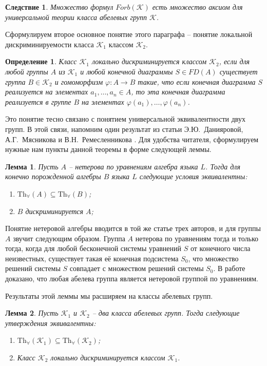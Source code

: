 \documentclass[a4paper,11pt,twoside]{article}
\newtheorem{lemma}{Лемма}[section]
\newtheorem{corollary}{Следствие}[section]
\newtheorem{definition}{Определение}[section]
\def\K{{\mathcal{K}}}
\def\Tha{{\mathrm{Th}_\forall}}
\begin{document}
\begin{corollary}\label{cor:ForbIsAxioms}
Множество формул $Forb(\K)$ есть множество аксиом для универсальной теории класса абелевых групп $\K$.
\end{corollary}


Сформулируем второе основное понятие этого параграфа -- понятие локальной дискриминируемости класса $\K_1$ классом $\K_2$.
\begin{definition}
Класс $\K_1$ локально дискриминируется классом $\K_2$, если для любой группы $A$ из $\K_1$ и любой конечной диаграммы $S \in FD(A)$ существует группа $B \in \K_2$ и гомоморфизм $\varphi: A \rightarrow B$ такие, что если конечная диаграмма $S$ реализуется на элементах $a_1, \ldots, a_n \in A$, то эта конечная диаграмма реализуется в группе $B$ на элементах $\varphi(a_1), \ldots, \varphi(a_n)$.
\end{definition}

Это понятие тесно связано с понятием универсальной эквивалентности двух групп. В этой связи, напомним один результат из статьи Э.Ю.~Данияровой, А.Г.~Мясникова и В.Н.~Ремесленникова \cite{DMR1}. Для удобства читателя, сформулируем нужные нам пункты данной теоремы в форме следующей леммы.

\begin{lemma}\label{lemma:UnivEquiv}
Пусть $A$ -- нетерова по уравнениям алгебра языка $L$. Тогда для конечно порожденной алгебры $B$ языка $L$ следующие условия эквивалентны:
\begin{enumerate}
\item $\mathrm{Th}_{\forall}(A) \subseteq \mathrm{Th}_{\forall}(B)$;
\item $B$ дискриминируется $A$;
\end{enumerate}
\end{lemma}

Понятие нетеровой алгебры вводится в той же статье трех авторов, и для группы $A$ звучит следующим образом. Группа $A$ нетерова по уравнениям тогда и только тогда, когда для любой бесконечной системы уравнений $S$ от конечного числа неизвестных, существует такая её конечная подсистема $S_0$, что множество решений системы $S$ совпадает с множеством решений системы $S_0$. В работе \cite{DMR2} доказано, что любая абелева группа является нетеровой группой по уравнениям.

Результаты этой леммы мы расширяем на классы абелевых групп.

\begin{lemma}\label{lemma:UnivEquivForClass}
Пусть $\K_1$ и $\K_2$ -- два класса абелевых групп. Тогда следующие утверждения эквивалентны:
\begin{enumerate}
\item $\Tha(\K_1) \subseteq \Tha(\K_2)$;
\item Класс $\K_2$ локально дискриминируется классом $\K_1$.
\end{enumerate}
\end{lemma}
\end{document}
